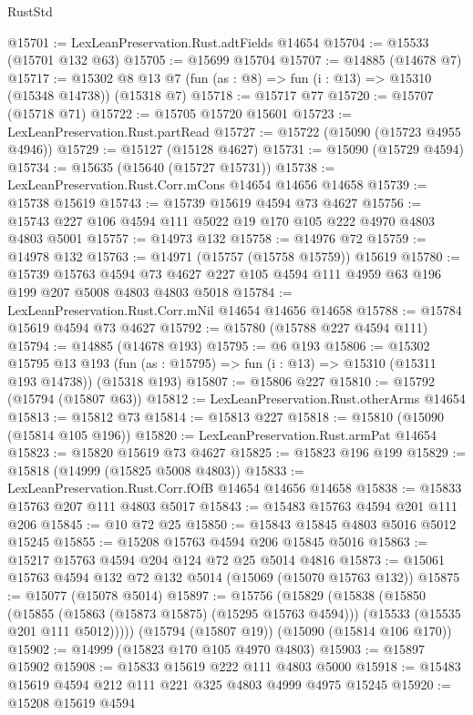 \begin{lexlean}{RustStd}
\begin{coremodule}
@15701 := LexLeanPreservation.Rust.adtFields @14654
@15704 := @15533 (@15701 @132 @63)
@15705 := @15699 @15704
@15707 := @14885 (@14678 @7)
@15717 := @15302 @8 @13 @7 (fun (as : @8) => fun (i : @13) => @15310 (@15348 @14738)) (@15318 @7)
@15718 := @15717 @77
@15720 := @15707 (@15718 @71)
@15722 := @15705 @15720 @15601
@15723 := LexLeanPreservation.Rust.partRead
@15727 := @15722 (@15090 (@15723 @4955 @4946))
@15729 := @15127 (@15128 @4627)
@15731 := @15090 (@15729 @4594)
@15734 := @15635 (@15640 (@15727 @15731))
@15738 := LexLeanPreservation.Rust.Corr.mCons @14654 @14656 @14658
@15739 := @15738 @15619
@15743 := @15739 @15619 @4594 @73 @4627
@15756 := @15743 @227 @106 @4594 @111 @5022 @19 @170 @105 @222 @4970 @4803 @4803 @5001
@15757 := @14973 @132
@15758 := @14976 @72
@15759 := @14978 @132
@15763 := @14971 (@15757 (@15758 @15759)) @15619
@15780 := @15739
    @15763
    @4594
    @73
    @4627
    @227
    @105
    @4594
    @111
    @4959
    @63
    @196
    @199
    @207
    @5008
    @4803
    @4803
    @5018
@15784 := LexLeanPreservation.Rust.Corr.mNil @14654 @14656 @14658
@15788 := @15784 @15619 @4594 @73 @4627
@15792 := @15780 (@15788 @227 @4594 @111)
@15794 := @14885 (@14678 @193)
@15795 := @6 @193
@15806 := @15302
    @15795
    @13
    @193
    (fun (as : @15795) => fun (i : @13) => @15310 (@15311 @193 @14738))
    (@15318 @193)
@15807 := @15806 @227
@15810 := @15792 (@15794 (@15807 @63))
@15812 := LexLeanPreservation.Rust.otherArms @14654
@15813 := @15812 @73
@15814 := @15813 @227
@15818 := @15810 (@15090 (@15814 @105 @196))
@15820 := LexLeanPreservation.Rust.armPat @14654
@15823 := @15820 @15619 @73 @4627
@15825 := @15823 @196 @199
@15829 := @15818 (@14999 (@15825 @5008 @4803))
@15833 := LexLeanPreservation.Rust.Corr.fOfB @14654 @14656 @14658
@15838 := @15833 @15763 @207 @111 @4803 @5017
@15843 := @15483 @15763 @4594 @201 @111 @206
@15845 := @10 @72 @25
@15850 := @15843 @15845 @4803 @5016 @5012 @15245
@15855 := @15208 @15763 @4594 @206 @15845 @5016
@15863 := @15217 @15763 @4594 @204 @124 @72 @25 @5014 @4816
@15873 := @15061 @15763 @4594 @132 @72 @132 @5014 (@15069 (@15070 @15763 @132))
@15875 := @15077 (@15078 @5014)
@15897 := @15756
    (@15829
      (@15838
        (@15850
          (@15855 (@15863 (@15873 @15875) (@15295 @15763 @4594)))
          (@15533 (@15535 @201 @111 @5012)))))
    (@15794 (@15807 @19))
    (@15090 (@15814 @106 @170))
@15902 := @14999 (@15823 @170 @105 @4970 @4803)
@15903 := @15897 @15902
@15908 := @15833 @15619 @222 @111 @4803 @5000
@15918 := @15483 @15619 @4594 @212 @111 @221 @325 @4803 @4999 @4975 @15245
@15920 := @15208 @15619 @4594

\end{coremodule}
\end{lexlean}
